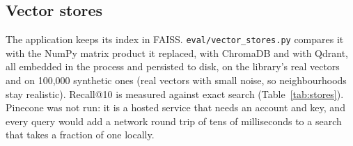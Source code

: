 \documentclass[11pt,a4paper]{article}
\newcommand{\code}[1]{\texttt{#1}}
\begin{document}
\subsection{Vector stores}\label{sec:stores}
The application keeps its index in FAISS. \code{eval/vector\_stores.py} compares it with the NumPy matrix
product it replaced, with ChromaDB and with Qdrant, all embedded in the process and persisted to disk, on
the library's real vectors and on 100,000 synthetic ones (real vectors with small noise, so neighbourhoods
stay realistic). Recall@10 is measured against exact search (Table~\ref{tab:stores}). Pinecone was not run:
it is a hosted service that needs an account and key, and every query would add a network round trip of
tens of milliseconds to a search that takes a fraction of one locally.

\begin{table}[htbp]\centering\small
{}
\caption{Vector stores, 384-dimensional vectors, 77 queries. \emph{One paper} restricts the search to one
paper's passages, as the Reader does.}\label{tab:stores}
\end{table}
\end{document}
